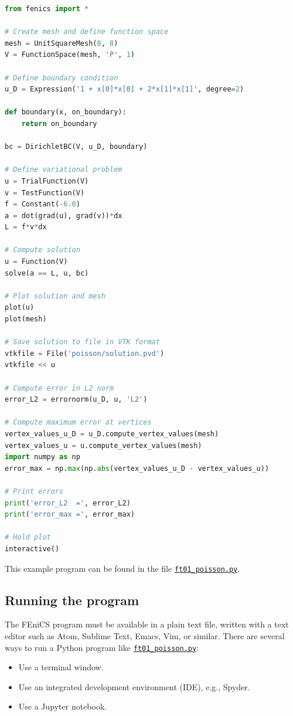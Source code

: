 \documentclass[graybox,envcountchap,sectrefs,final]{svmonodo}
\begin{document}
\begin{lstlisting}[language=Python,style=graycolor]
from fenics import *

# Create mesh and define function space
mesh = UnitSquareMesh(8, 8)
V = FunctionSpace(mesh, 'P', 1)

# Define boundary condition
u_D = Expression('1 + x[0]*x[0] + 2*x[1]*x[1]', degree=2)

def boundary(x, on_boundary):
    return on_boundary

bc = DirichletBC(V, u_D, boundary)

# Define variational problem
u = TrialFunction(V)
v = TestFunction(V)
f = Constant(-6.0)
a = dot(grad(u), grad(v))*dx
L = f*v*dx

# Compute solution
u = Function(V)
solve(a == L, u, bc)

# Plot solution and mesh
plot(u)
plot(mesh)

# Save solution to file in VTK format
vtkfile = File('poisson/solution.pvd')
vtkfile << u

# Compute error in L2 norm
error_L2 = errornorm(u_D, u, 'L2')

# Compute maximum error at vertices
vertex_values_u_D = u_D.compute_vertex_values(mesh)
vertex_values_u = u.compute_vertex_values(mesh)
import numpy as np
error_max = np.max(np.abs(vertex_values_u_D - vertex_values_u))

# Print errors
print('error_L2  =', error_L2)
print('error_max =', error_max)

# Hold plot
interactive()
\end{lstlisting}
This example program can be found in the file \href{{https://fenicsproject.org/pub/tutorial/python/vol1/ft01_poisson.py}}{\nolinkurl{ft01_poisson.py}}.


\subsection{Running the program}
\label{ch:poisson0:impl:run}

The FEniCS program must be available in a plain text file, written with a
text editor such as Atom, Sublime Text, Emacs, Vim, or similar.
There are several ways to run a Python program like
\href{{https://fenicsproject.org/pub/tutorial/python/vol1/ft01_poisson.py}}{\nolinkurl{ft01_poisson.py}}:

\begin{itemize}
 \item Use a terminal window.

 \item Use an integrated development environment (IDE), e.g., Spyder.

 \item Use a Jupyter notebook.
\end{itemize}
\end{document}
